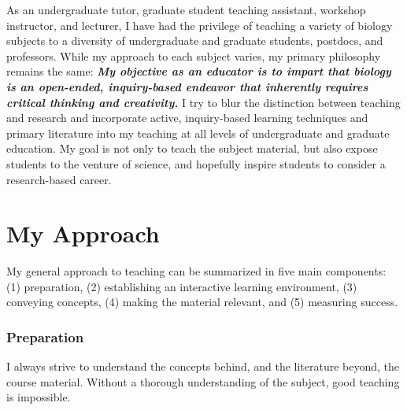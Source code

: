 As an undergraduate tutor, graduate student teaching assistant, workshop
instructor, and lecturer,
I have had the privilege of teaching a variety of biology subjects to a
diversity of undergraduate and graduate students, postdocs, and professors.
While my approach to each subject varies, my primary philosophy remains the
same:
\textbf{\textit{My objective as an educator is to impart that biology is an
open-ended, inquiry-based endeavor that inherently requires critical thinking
and creativity.}}
I try to blur the distinction between teaching and research and incorporate
active, inquiry-based learning techniques and primary literature into my
teaching at all levels of undergraduate and graduate education.
My goal is not only to teach the subject material, but also expose students to
the venture of science, and hopefully inspire students to consider a
research-based career. 

\section*{My Approach}
My general approach to teaching can be summarized in five main components:
(1) preparation,
(2) establishing an interactive learning environment,
(3) conveying concepts,
(4) making the material relevant,
and
(5) measuring success.

\subsubsection*{Preparation}
I always strive to understand the concepts behind, and the literature beyond,
the course material.
Without a thorough understanding of the subject, good teaching is impossible.

